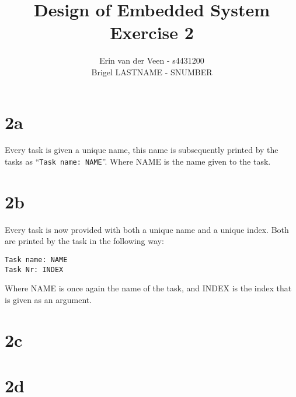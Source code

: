\documentclass{scrartcl}
\title{Design of Embedded System\\Exercise 2}
\author{Erin van der Veen - s4431200\\
	Brigel LASTNAME - SNUMBER}
\begin{document}
\maketitle

\section*{2a}
Every task is given a unique name, this name is subsequently printed by the tasks as ``\lstinline|Task name: NAME|''.
Where NAME is the name given to the task.

\section*{2b}
Every task is now provided with both a unique name and a unique index.
Both are printed by the task in the following way:
\begin{lstlisting}
Task name: NAME
Task Nr: INDEX
\end{lstlisting}
Where NAME is once again the name of the task, and INDEX is the index that is given as an argument.

\section*{2c}

\section*{2d}
\end{document}
